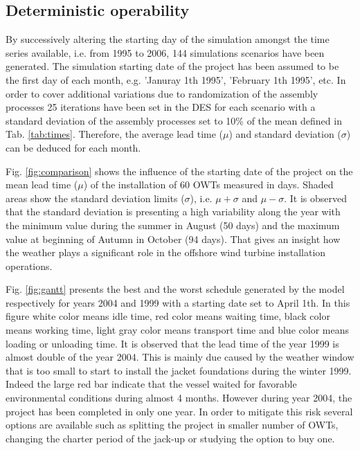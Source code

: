 \subsection{Deterministic operability}
By successively altering the starting day of the simulation amongst the time series available, i.e. from 1995 to 2006, 144 simulations scenarios have been generated. The simulation starting date of the project has been assumed to be the first day of each month, e.g. 'Januray 1th 1995', 'February 1th 1995', etc. In order to cover additional variations due to randomization of the assembly processes 25 iterations have been set in the DES for each scenario with a standard deviation of the assembly processes set to 10\% of the mean defined in Tab. \ref{tab:times}. Therefore, the average lead time ($\mu$) and standard deviation ($\sigma$) can be deduced for each month.

Fig. \ref{fig:comparison} shows the influence of the starting date of the project on the mean lead time ($\mu$) of the installation of 60 OWTs measured in days. Shaded areas show the standard deviation limits ($\sigma$), i.e. $\mu + \sigma$ and $\mu - \sigma$. It is observed that the standard deviation is presenting a high variability along the year with the minimum value during the summer in August (50 days) and the maximum value at beginning of Autumn in October (94 days). That gives an insight how the weather plays a significant role in the offshore wind turbine installation operations.

Fig. \ref{fig:gantt} presents the best and the worst schedule generated by the model respectively for years 2004 and 1999 with a starting date set to April 1th. In this figure white color means idle time, red color means waiting time, black color means working time, light gray color means transport time and blue color means loading or unloading time. It is observed that the lead time of the year 1999 is almost double of the year 2004. This is mainly due caused by the weather window that is too small to start to install the jacket foundations during the winter 1999. Indeed the large red bar indicate that the vessel waited for favorable environmental conditions during almost 4 months. However during year 2004, the project has been completed in only one year. In order to mitigate this risk several options are available such as splitting the project in smaller number of OWTs, changing the charter period of the jack-up or studying the option to buy one.

